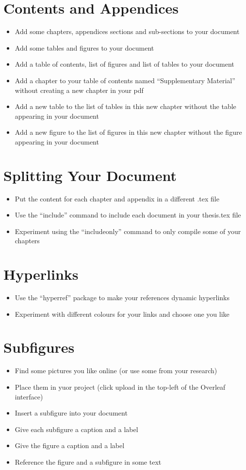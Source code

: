 \documentclass[11pt,a4paper]{article}
\begin{document}
\section{Contents and Appendices}
\begin{itemize}
\item Add some chapters, appendices sections and sub-sections to your document
\item Add some tables and figures to your document
\item Add a table of contents, list of figures and list of tables to your document
\item Add a chapter to your table of contents named ``Supplementary Material'' without creating a new chapter in your pdf
\item Add a new table to the list of tables in this new chapter without the table appearing in your document
\item Add a new figure to the list of figures in this new chapter without the figure appearing in your document
\end{itemize}

\section{Splitting Your Document}
\begin{itemize}
\item Put the content for each chapter and appendix in a different .tex file
\item Use the ``include'' command to include each document in your thesis.tex file
\item Experiment using the ``includeonly'' command to only compile some of your chapters
\end{itemize}

\section{Hyperlinks}
\begin{itemize}
\item Use the ``hyperref'' package to make your references dynamic hyperlinks
\item Experiment with different colours for your links and choose one you like
\end{itemize}

\section{Subfigures}
\begin{itemize}
\item Find some pictures you like online (or use some from your research)
\item Place them in yuor project (click upload in the top-left of the Overleaf interface)
\item Insert a subfigure into your document
\item Give each subfigure a caption and a label
\item Give the figure a caption and a label
\item Reference the figure and a subfigure in some text
\end{itemize}
\end{document}
